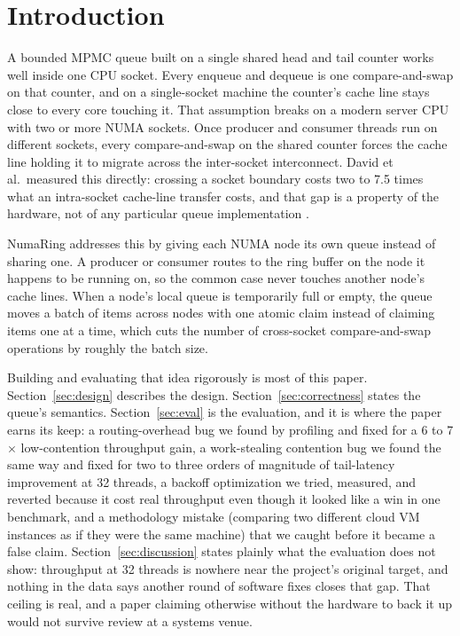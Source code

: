 \documentclass[10pt,journal,compsoc]{IEEEtran}
\begin{document}
\maketitle

\IEEEdisplaynontitleabstractindextext
\IEEEpeerreviewmaketitle

\section{Introduction}

A bounded MPMC queue built on a single shared head and tail counter works well inside one CPU
socket. Every enqueue and dequeue is one compare-and-swap on that counter, and on a single-socket
machine the counter's cache line stays close to every core touching it. That assumption breaks on
a modern server CPU with two or more NUMA sockets. Once producer and consumer threads run on
different sockets, every compare-and-swap on the shared counter forces the cache line holding it
to migrate across the inter-socket interconnect. David et al.\ measured this directly: crossing a
socket boundary costs two to 7.5 times what an intra-socket cache-line transfer costs, and that
gap is a property of the hardware, not of any particular queue implementation
\cite{david2013everything}.

NumaRing addresses this by giving each NUMA node its own queue instead of sharing one. A producer
or consumer routes to the ring buffer on the node it happens to be running on, so the common case
never touches another node's cache lines. When a node's local queue is temporarily full or empty,
the queue moves a batch of items across nodes with one atomic claim instead of claiming items one
at a time, which cuts the number of cross-socket compare-and-swap operations by roughly the batch
size.

Building and evaluating that idea rigorously is most of this paper. Section~\ref{sec:design}
describes the design. Section~\ref{sec:correctness} states the queue's semantics. Section~\ref{sec:eval}
is the evaluation, and it is where the paper earns its keep: a routing-overhead bug we found by
profiling and fixed for a 6 to 7$\times$ low-contention throughput gain, a work-stealing
contention bug we found the same way and fixed for two to three orders of magnitude of tail-latency
improvement at 32 threads, a backoff optimization we tried, measured, and reverted because it cost
real throughput even though it looked like a win in one benchmark, and a methodology mistake
(comparing two different cloud VM instances as if they were the same machine) that we caught
before it became a false claim. Section~\ref{sec:discussion} states plainly what the evaluation
does not show: throughput at 32 threads is nowhere near the project's original target, and nothing
in the data says another round of software fixes closes that gap. That ceiling is real, and a
paper claiming otherwise without the hardware to back it up would not survive review at a systems
venue.
\end{document}
